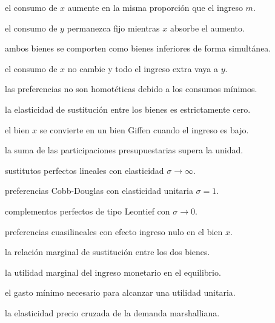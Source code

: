 \begin{opts}
    \item el consumo de $x$ aumente en la misma proporción que el ingreso $m$.
    \item el consumo de $y$ permanezca fijo mientras $x$ absorbe el aumento.
    \item ambos bienes se comporten como bienes inferiores de forma simultánea.
    \item el consumo de $x$ no cambie y todo el ingreso extra vaya a $y$.
\end{opts}

\begin{opts}
    \item las preferencias no son homotéticas debido a los consumos mínimos.
    \item la elasticidad de sustitución entre los bienes es estrictamente cero.
    \item el bien $x$ se convierte en un bien Giffen cuando el ingreso es bajo.
    \item la suma de las participaciones presupuestarias supera la unidad.
\end{opts}

\begin{opts}
    \item sustitutos perfectos lineales con elasticidad $\sigma \to \infty$.
    \item preferencias Cobb-Douglas con elasticidad unitaria $\sigma = 1$.
    \item complementos perfectos de tipo Leontief con $\sigma \to 0$.
    \item preferencias cuasilineales con efecto ingreso nulo en el bien $x$.
\end{opts}

\begin{opts}
    \item la relación marginal de sustitución entre los dos bienes.
    \item la utilidad marginal del ingreso monetario en el equilibrio.
    \item el gasto mínimo necesario para alcanzar una utilidad unitaria.
    \item la elasticidad precio cruzada de la demanda marshalliana.
\end{opts}

